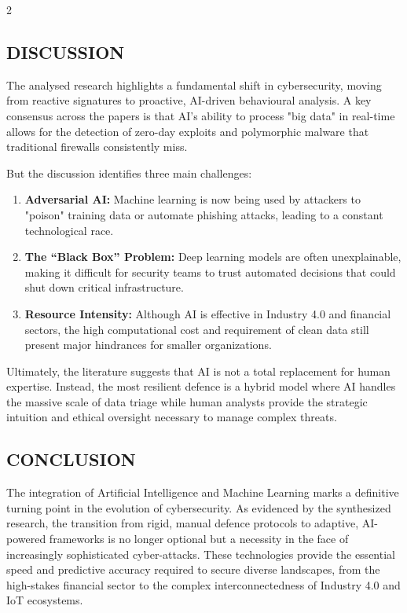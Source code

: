 \begin{multicols}{2}
  \subsection*{\centering\uppercase{DISCUSSION}}
  The analysed research highlights a fundamental shift in cybersecurity, moving from reactive signatures to proactive, AI-driven behavioural analysis. A key consensus across the papers is that AI’s ability to process "big data" in real-time allows for the detection of zero-day exploits and polymorphic malware that traditional firewalls consistently miss.

  \noindent
  But the discussion identifies three main challenges:
  \begin{enumerate}
    \item \textbf{Adversarial AI:} Machine learning is now being used by attackers to "poison" training data or automate phishing attacks, leading to a constant technological race.
    \item \textbf{The “Black Box” Problem:} Deep learning models are often unexplainable, making it difficult for security teams to trust automated decisions that could shut down critical infrastructure.
    \item \textbf{Resource Intensity:} Although AI is effective in Industry 4.0 and financial sectors, the high computational cost and requirement of clean data still present major hindrances for smaller organizations.
  \end{enumerate}
  Ultimately, the literature suggests that AI is not a total replacement for human expertise. Instead, the most resilient defence is a hybrid model where AI handles the massive scale of data triage while human analysts provide the strategic intuition and ethical oversight necessary to manage complex threats.

  \subsection*{\centering\uppercase{CONCLUSION}}
  The integration of Artificial Intelligence and Machine Learning marks a definitive turning point in the evolution of cybersecurity. As evidenced by the synthesized research, the transition from rigid, manual defence protocols to adaptive, AI-powered frameworks is no longer optional but a necessity in the face of increasingly sophisticated cyber-attacks. These technologies provide the essential speed and predictive accuracy required to secure diverse landscapes, from the high-stakes financial sector to the complex interconnectedness of Industry 4.0 and IoT ecosystems.


\end{multicols}
